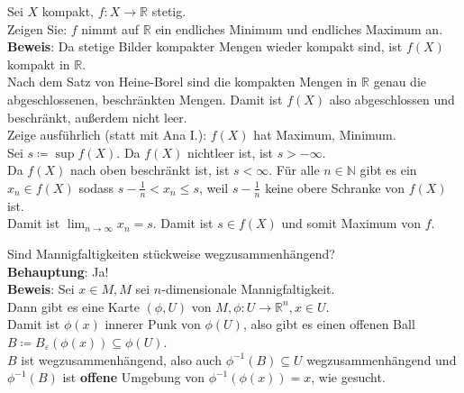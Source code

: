 \begin{problem*}[3]
  Sei \( X \) kompakt, \( f: X \to \mathbb{R} \) stetig. \\
  Zeigen Sie: \( f \) nimmt auf \( \mathbb{R} \) ein endliches Minimum und endliches Maximum an. \\
  \textbf{Beweis}: Da stetige Bilder kompakter Mengen wieder kompakt sind, ist \( f(X) \) kompakt in \( \mathbb{R} \). \\
  Nach dem Satz von Heine-Borel sind die kompakten Mengen in \( \mathbb{R} \) genau die abgeschlossenen, beschränkten Mengen. Damit ist \( f(X) \) also abgeschlossen und beschränkt, außerdem nicht leer. \\
  Zeige ausführlich (statt mit Ana I.): \( f(X) \) hat Maximum, Minimum. \\
  Sei \( s \coloneqq \sup f(X) \). Da \( f(X) \) nichtleer ist, ist \( s > - \infty \). \\
  Da \( f(X) \) nach oben beschränkt ist, ist \( s < \infty \).
  Für alle \( n \in \mathbb{N} \) gibt es ein \( x_n \in f(X) \) sodass \( s - \frac{1}{n} < x_n \leq s \), weil \( s - \frac{1}{n} \) keine obere Schranke von \( f(X) \) ist. \\
  Damit ist \( \lim_{n \rightarrow \infty} x_n = s \). Damit ist \( s \in f(X) \) und somit Maximum von \( f \). \\
\end{problem*}

\begin{problem*}[4a]
  Sind Mannigfaltigkeiten stückweise wegzusammenhängend? \\
  \textbf{Behauptung}: Ja! \\
  \textbf{Beweis}: Sei \( x \in M, M \) sei \( n \)-dimensionale Mannigfaltigkeit. \\
  Dann gibt es eine Karte \( (\phi, U) \) von \( M, \phi: U \to \mathbb{R}^n, x \in U \). \\
  Damit ist \( \phi(x) \) innerer Punk von \( \phi(U) \), also gibt es einen offenen Ball \\ \( B \coloneqq B_\varepsilon(\phi(x)) \subseteq \phi(U) \). \\
  \( B \) ist wegzusammenhängend, also auch \( \phi^{-1}(B) \subseteq U \) wegzusammenhängend und \( \phi^{-1}(B) \) ist \textbf{offene} Umgebung von \( \phi^{-1}(\phi(x)) = x \), wie gesucht.
\end{problem*}

